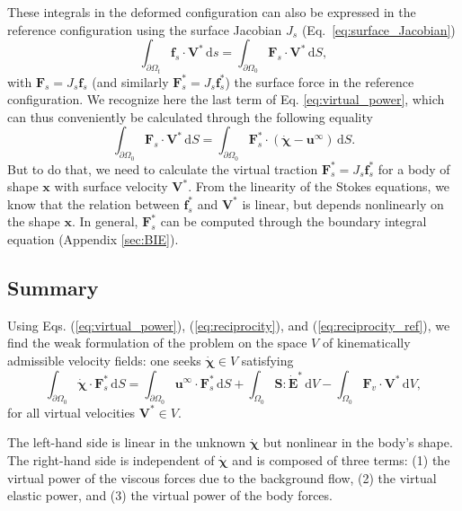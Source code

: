 \documentclass[aps,prfluids,groupedaddress]{revtex4-2}
\newcommand{\rmd}{\mathrm{d}}
\newcommand{\bff}{\bm{f}}
\newcommand{\bu}{\bm{u}}
\newcommand{\bx}{\bm{x}}
\newcommand{\bF}{\bm{F}}
\newcommand{\bV}{\bm{V}}
\newcommand{\tEd}{\bm{\dot {E}}}
\newcommand{\tS}{\bm{{S}}}
\newcommand{\bxd}{\bm{\dot \chi}}
\begin{document}
These integrals in the deformed configuration can also be expressed in the reference configuration using the surface Jacobian $J_s$ (Eq.~\ref{eq:surface_Jacobian})
\begin{equation}
\int_{\partial \Omega_t} \bff_s \cdot \bV^* \, \rmd s =
\int_{\partial \Omega_0} \bF_s \cdot \bV^* \, \rmd S,
\end{equation}
with $\bF_s = J_s\bff_s$ (and similarly $\bF_s^* = J_s\bff_s^*$) the surface force in the reference configuration. We recognize here the last term of Eq. \eqref{eq:virtual_power}, which can thus conveniently be calculated through the following equality
\begin{equation}\label{eq:reciprocity_ref}
\int_{\partial \Omega_0} \bF_s \cdot \bV^* \, \rmd S=
\int_{\partial \Omega_0} \bF^*_s \cdot \left(
										 \bxd - \bu^\infty
									\right) \, \rmd S.
\end{equation}
But to do that, we need to calculate the virtual traction $\bF_s^* = J_s \bff_s^*$ for a body of shape $\bx$ with surface velocity $\bV^*$. From the linearity of the Stokes equations, we know that the relation between $\bff_s^*$ and $\bV^*$ is linear, but depends nonlinearly on the shape $\bx$. In general, $\bF_s^*$ can be computed through the boundary integral equation (Appendix \ref{sec:BIE}). 



\subsection{Summary}
Using Eqs. (\ref{eq:virtual_power}), (\ref{eq:reciprocity}), and (\ref{eq:reciprocity_ref}), we find the weak formulation of the problem on the space $V$ of kinematically admissible velocity fields: one seeks $\bxd\in V$ satisfying 
\begin{equation}\label{eq:weak_form}
\int_{\partial \Omega_0} \bxd  \cdot \bF_s^*\, \rmd S =
	\int_{\partial \Omega_0}   \bu^\infty \cdot \bF_s^* \, \rmd S + 
	\int_{\Omega_0} \tS : \tEd^* \, \rmd V -
	\int_{\Omega_0} \bF_v \cdot \bV^* \, \rmd V,
\end{equation}
for all virtual velocities $\bV^*\in V$.

The left-hand side is linear in the unknown $\bxd$ but nonlinear in the body's shape. The right-hand side is independent of $\bxd$ and is composed of three terms: (1) the virtual power of the viscous forces due to the background flow, (2) the virtual elastic power, and (3) the virtual power of the body forces.
\end{document}
